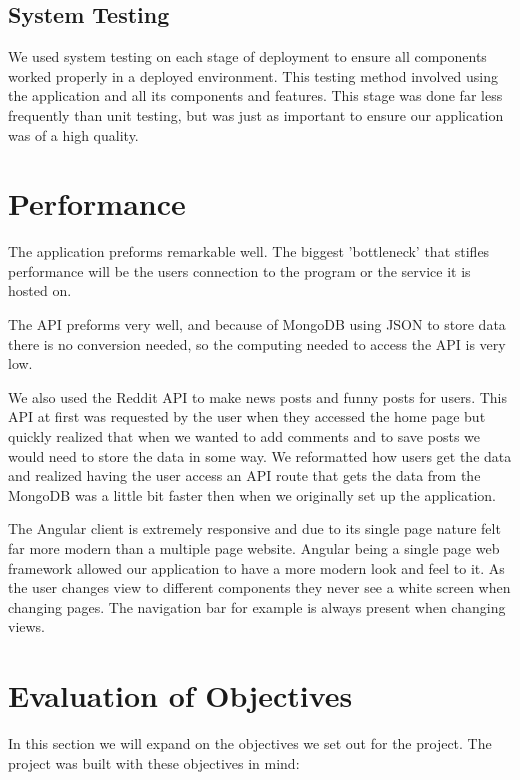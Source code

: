 \subsection{System Testing}
We used system testing on each stage of deployment to ensure all components worked properly in a deployed environment. This testing method involved using the application and all its components and features. This stage was done far less frequently than unit testing, but was just as important to ensure our application was of a high quality.

\section{Performance}
The application preforms remarkable well. The biggest 'bottleneck' that stifles performance will be the users connection to the program or the service it is hosted on.

The API preforms very well, and because of MongoDB using JSON to store data there is no conversion needed, so the computing needed to access the API is very low.

We also used the Reddit API to make news posts and funny posts for users. This API at first was requested by the user when they accessed the home page but quickly realized that when we wanted to add comments and to save posts we would need to store the data in some way. We reformatted how users get the data and realized having the user access an API route that gets the data from the MongoDB was a little bit faster then when we originally set up the application.

The Angular client is extremely responsive and due to its single page nature felt far more modern than a multiple page website. Angular being a single page web framework allowed our application to have a more modern look and feel to it. As the user changes view to different components they never see a white screen when changing pages. The navigation bar for example is always present when changing views.

\section{Evaluation of Objectives}
In this section we will expand on the objectives we set out for the project. The project was built with these objectives in mind:

